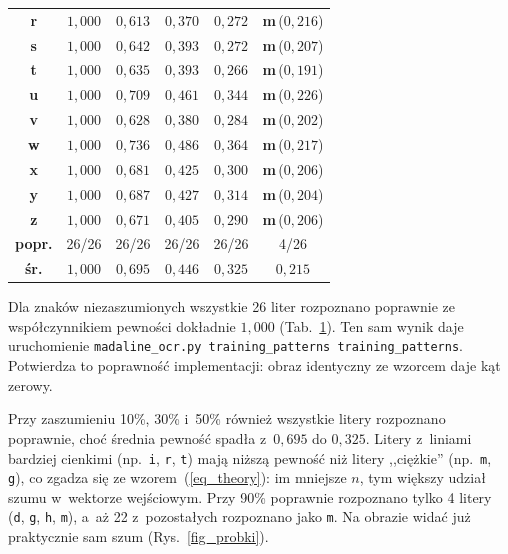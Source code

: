 \documentclass[12pt]{article}
\begin{document}
\begin{table}[h!]
\begin{tabular}{c c c c c c}
  \textbf{r} & $1{,}000$ & $0{,}613$ & $0{,}370$ & $0{,}272$ & \textbf{m}\,($0{,}216$) \\
  \textbf{s} & $1{,}000$ & $0{,}642$ & $0{,}393$ & $0{,}272$ & \textbf{m}\,($0{,}207$) \\
  \textbf{t} & $1{,}000$ & $0{,}635$ & $0{,}393$ & $0{,}266$ & \textbf{m}\,($0{,}191$) \\
  \textbf{u} & $1{,}000$ & $0{,}709$ & $0{,}461$ & $0{,}344$ & \textbf{m}\,($0{,}226$) \\
  \textbf{v} & $1{,}000$ & $0{,}628$ & $0{,}380$ & $0{,}284$ & \textbf{m}\,($0{,}202$) \\
  \textbf{w} & $1{,}000$ & $0{,}736$ & $0{,}486$ & $0{,}364$ & \textbf{m}\,($0{,}217$) \\
  \textbf{x} & $1{,}000$ & $0{,}681$ & $0{,}425$ & $0{,}300$ & \textbf{m}\,($0{,}206$) \\
  \textbf{y} & $1{,}000$ & $0{,}687$ & $0{,}427$ & $0{,}314$ & \textbf{m}\,($0{,}204$) \\
  \textbf{z} & $1{,}000$ & $0{,}671$ & $0{,}405$ & $0{,}290$ & \textbf{m}\,($0{,}206$) \\
  \hline
  \textbf{popr.} & 26/26 & 26/26 & 26/26 & 26/26 & 4/26 \\
  \textbf{śr.} & $1{,}000$ & $0{,}695$ & $0{,}446$ & $0{,}325$ & $0{,}215$ \\[0.1cm]
  \hline
 \end{tabular}
 \label{tab_req}
\end{table}

\noindent Dla znaków niezaszumionych wszystkie 26 liter rozpoznano poprawnie
ze współczynnikiem pewności dokładnie $1{,}000$ (Tab.~\ref{tab_req}). Ten sam wynik daje
uruchomienie \texttt{madaline\_ocr.py training\_patterns training\_patterns}.
Potwierdza to poprawność implementacji: obraz identyczny ze wzorcem daje kąt zerowy.

Przy zaszumieniu 10\%, 30\% i~50\% również wszystkie litery rozpoznano poprawnie,
choć średnia pewność spadła z~$0{,}695$ do $0{,}325$. Litery z~liniami bardziej
cienkimi (np.~\texttt{i}, \texttt{r}, \texttt{t}) mają niższą pewność niż litery
,,ciężkie'' (np.~\texttt{m}, \texttt{g}), co zgadza się ze wzorem~(\ref{eq_theory}):
im mniejsze $n$, tym większy udział szumu w~wektorze wejściowym. Przy 90\% poprawnie
rozpoznano tylko 4 litery (\texttt{d}, \texttt{g}, \texttt{h}, \texttt{m}), a~aż 22
z~pozostałych rozpoznano jako \texttt{m}. Na obrazie widać już praktycznie sam szum
(Rys.~\ref{fig_probki}).

\end{document}
